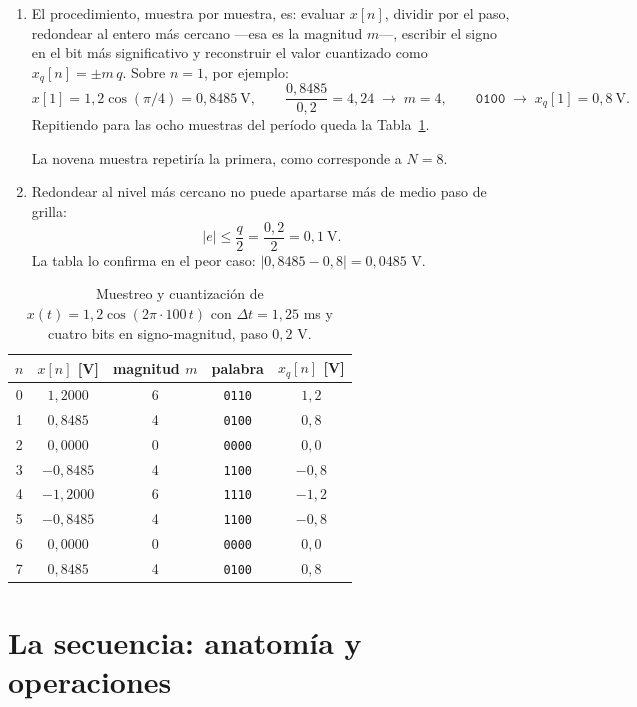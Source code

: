 \documentclass[10pt,a4paper]{article}
\newcommand{\tema}[1]{%
  \bigskip
  \section*{#1}
  \vspace{-0.6em}
}
\begin{document}
\begin{enumerate}
		\item El procedimiento, muestra por muestra, es: evaluar $x[n]$,
		dividir por el paso, redondear al entero más cercano ---esa es la magnitud $m$---,
		escribir el signo en el bit más significativo y reconstruir el valor cuantizado como
		$x_q[n] = \pm m\,q$. Sobre $n=1$, por ejemplo:
		\[
			x[1] = 1{,}2\cos(\pi/4) = 0{,}8485\ \text{V},
			\qquad \frac{0{,}8485}{0{,}2} = 4{,}24 \;\to\; m = 4,
			\qquad \texttt{0100} \;\to\; x_q[1] = 0{,}8\ \text{V}.
		\]
		Repitiendo para las ocho muestras del período queda la Tabla~\ref{tab:sol_ej1}.

		La novena muestra repetiría la primera, como corresponde a $N=8$.

		\item Redondear al nivel más cercano no puede apartarse
		más de medio paso de grilla:
		\[
			|e| \leq \frac{q}{2} = \frac{0{,}2}{2} = 0{,}1\ \text{V}.
		\]
		La tabla lo confirma en el peor caso: $|0{,}8485 - 0{,}8| = 0{,}0485$ V.
	\end{enumerate}

	\begin{table}[H]
		\centering
		\caption{Muestreo y cuantización de $x(t)=1{,}2\cos(2\pi\cdot100\,t)$ con
		$\Delta t = 1{,}25$ ms y cuatro bits en signo-magnitud, paso $0{,}2$ V.}
		\label{tab:sol_ej1}
		\begin{tabular}{ccccc}
			\toprule
			$n$ & $x[n]$ [V] & magnitud $m$ & palabra & $x_q[n]$ [V] \\
			\midrule
			0 & $ 1{,}2000$ & 6 & \texttt{0110} & $ 1{,}2$ \\
			1 & $ 0{,}8485$ & 4 & \texttt{0100} & $ 0{,}8$ \\
			2 & $ 0{,}0000$ & 0 & \texttt{0000} & $ 0{,}0$ \\
			3 & $-0{,}8485$ & 4 & \texttt{1100} & $-0{,}8$ \\
			4 & $-1{,}2000$ & 6 & \texttt{1110} & $-1{,}2$ \\
			5 & $-0{,}8485$ & 4 & \texttt{1100} & $-0{,}8$ \\
			6 & $ 0{,}0000$ & 0 & \texttt{0000} & $ 0{,}0$ \\
			7 & $ 0{,}8485$ & 4 & \texttt{0100} & $ 0{,}8$ \\
			\bottomrule
		\end{tabular}
	\end{table}

	\tema{La secuencia: anatomía y operaciones}
\end{document}
